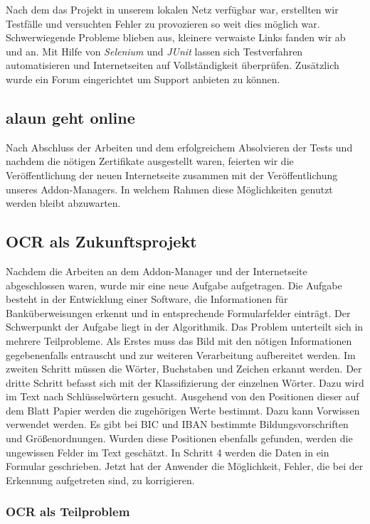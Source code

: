 \documentclass[12pt]{article}
\begin{document}
Nach dem das Projekt in unserem lokalen Netz verfügbar war, erstellten wir Testfälle und versuchten Fehler zu provozieren so weit dies möglich war.
Schwerwiegende Probleme blieben aus, kleinere verwaiste Links fanden wir ab und an. Mit Hilfe von \textit{Selenium} und \textit{JUnit} lassen sich
Testverfahren automatisieren und Internetseiten auf Vollständigkeit überprüfen. Zusätzlich wurde ein Forum eingerichtet um Support anbieten zu können.


\subsection{alaun geht online}

Nach Abschluss der Arbeiten und dem erfolgreichem Absolvieren der Tests und nachdem die nötigen Zertifikate ausgestellt waren,
feierten wir die Veröffentlichung der neuen Internetseite zusammen mit der Veröffentlichung unseres Addon-Managers.
In welchem Rahmen diese Möglichkeiten genutzt werden bleibt abzuwarten.

\subsection{OCR als Zukunftsprojekt}

Nachdem die Arbeiten an dem Addon-Manager und der Internetseite abgeschlossen waren, wurde mir eine neue Aufgabe aufgetragen.
Die Aufgabe besteht in der Entwicklung einer Software, die Informationen für Banküberweisungen erkennt und in
entsprechende Formularfelder einträgt.
Der Schwerpunkt der Aufgabe liegt in der Algorithmik. Das Problem unterteilt sich in mehrere Teilprobleme.
Als Erstes muss das Bild mit den nötigen Informationen gegebenenfalls entrauscht und zur weiteren Verarbeitung
aufbereitet werden. Im zweiten Schritt müssen die Wörter, Buchstaben und Zeichen erkannt werden. Der dritte
Schritt befasst sich mit der Klassifizierung der einzelnen Wörter.
Dazu wird im Text nach Schlüsselwörtern gesucht.
Ausgehend von den Positionen dieser auf dem Blatt Papier werden die zugehörigen Werte bestimmt.
Dazu kann Vorwissen verwendet werden. Es gibt bei BIC und IBAN bestimmte Bildungsvorschriften und Größenordnungen.
Wurden diese Positionen ebenfalls gefunden, werden die ungewissen Felder im Text geschätzt.
In Schritt 4 werden die Daten in ein Formular geschrieben. Jetzt hat der Anwender die Möglichkeit, Fehler, die bei der Erkennung
aufgetreten sind, zu korrigieren.

\subsubsection{OCR als Teilproblem}
\end{document}
